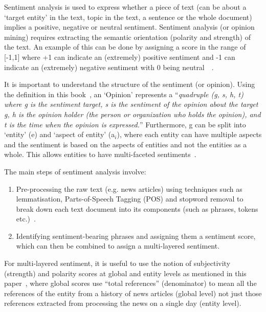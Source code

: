 Sentiment analysis is used to express whether a piece of text (can be about a `target entity' in the text, topic in the text, a sentence or the whole document) implies a positive, negative or neutral sentiment. Sentiment analysis (or opinion mining) requires extracting the semantic orientation (polarity and strength) of the text. An example of this can be done by assigning a score in the range of [-1,1] where +1 can indicate an (extremely) positive sentiment and -1 can indicate an (extremely) negative sentiment with 0 being neutral~\cite{16_liu2012sentiment}~\cite{18_kanakaraj2015nlp}. 

It is important to understand the structure of the sentiment (or opinion). Using the definition in this book~\cite{16_liu2012sentiment}, an `Opinion' represents a ``\textit{quadruple (g, s, h, t) where g is the sentiment target, s is the sentiment of the opinion about the target g,
h is the opinion holder (the person or organization who holds the opinion), and t is the time when the opinion is expressed.}'' Furthermore, g can be split into `entity' (e) and `aspect of entity' (a$_{i}$), where each entity can have multiple aspects and the sentiment is based on the aspects of entities and not the entities as a whole. This allows entities to have multi-faceted sentiments~\cite{18_kanakaraj2015nlp}. 

The main steps of sentiment analysis involve: 
\begin{enumerate}
\item Pre-processing the raw text (e.g. news articles) using techniques such as lemmatisation, Parts-of-Speech Tagging (POS) and stopword removal to break down each text document into its components (such as phrases, tokens etc.)~\cite{17_benamara2007sentiment}.
\item Identifying sentiment-bearing phrases and assigning them a sentiment score, which can then be combined to assign a multi-layered sentiment.
\end{enumerate}

For multi-layered sentiment, it is useful to use the notion of subjectivity (strength) and polarity scores at global and entity levels as mentioned in this paper~\cite{22_godbole2007large}, where global scores use ``total references'' (denominator) to mean all the references of the entity from a history of news articles (global level) not just those references extracted from processing the news on a single day (entity level).  

